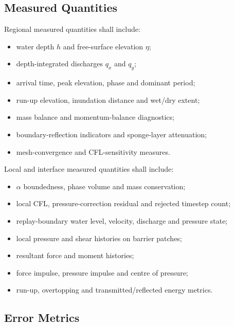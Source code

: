 
\subsection{Measured Quantities}
\label{sec:res-ver-spec-measured-quantities}

Regional measured quantities shall include:

\begin{itemize}
  \item water depth $h$ and free-surface elevation $\eta$;
  \item depth-integrated discharges $q_x$ and $q_y$;
  \item arrival time, peak elevation, phase and dominant period;
  \item run-up elevation, inundation distance and wet/dry extent;
  \item mass balance and momentum-balance diagnostics;
  \item boundary-reflection indicators and sponge-layer attenuation;
  \item mesh-convergence and CFL-sensitivity measures.
\end{itemize}

Local and interface measured quantities shall include:

\begin{itemize}
  \item $\alpha$ boundedness, phase volume and mass conservation;
  \item local CFL, pressure-correction residual and rejected timestep
    count;
  \item replay-boundary water level, velocity, discharge and pressure
    state;
  \item local pressure and shear histories on barrier patches;
  \item resultant force and moment histories;
  \item force impulse, pressure impulse and centre of pressure;
  \item run-up, overtopping and transmitted/reflected energy metrics.
\end{itemize}

\subsection{Error Metrics}
\label{sec:res-ver-spec-error-metrics}


